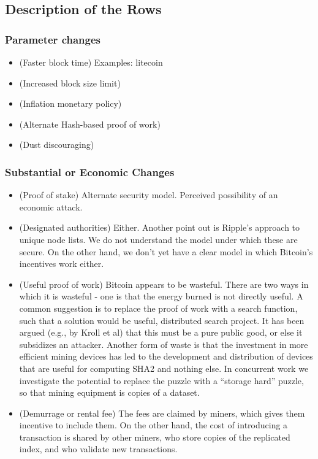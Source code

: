 \subsection{Description of the Rows}

\subsubsection{Parameter changes}
\begin{itemize}
\item (Faster block time) Examples: litecoin
\item (Increased block size limit)
\item (Inflation monetary policy)
\item (Alternate Hash-based proof of work)
\item (Dust discouraging)
\end{itemize}

\subsubsection{Substantial or Economic Changes}
\begin{itemize}
\item (Proof of stake) Alternate security model. Perceived possibility of an economic attack. 
\item (Designated authorities) Either. Another point out is Ripple's approach to unique node lists. We do not understand the model under which these are secure. On the other hand, we don't yet have a clear model in which Bitcoin's incentives work either. 
\item (Useful proof of work) Bitcoin appears to be wasteful. There are two ways in which it is wasteful - one is that the energy burned is not directly useful. A common suggestion is to replace the proof of work with a search function, such that a solution would be useful, distributed search project. It has been argued (e.g., by Kroll et al) that this must be a pure public good, or else it subsidizes an attacker. Another form of waste is that the investment in more efficient mining devices has led to the development and distribution of devices that are useful for computing SHA2 and nothing else. In concurrent work we investigate the potential to replace the puzzle with a ``storage hard'' puzzle, so that mining equipment is copies of a dataset.
\item (Demurrage or rental fee) The fees are claimed by miners, which gives them incentive to include them. On the other hand, the cost of introducing a transaction is shared by other miners, who store copies of the replicated index, and who validate new transactions.
\end{itemize}

